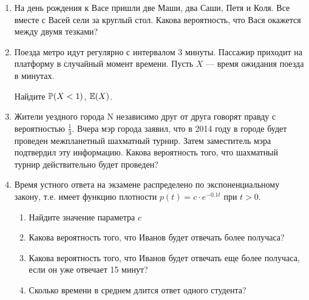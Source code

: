\begin{enumerate}
\item На день рождения к Васе пришли две Маши, два Саши, Петя и Коля. Все вместе с Васей сели за круглый стол. Какова вероятность, что Вася окажется между двумя тезками?

\item Поезда метро идут регулярно с интервалом 3 минуты. Пассажир
приходит на платформу в случайный момент времени. Пусть $X$ —
время ожидания поезда в минутах.

Найдите $\P(X<1)$, $\E(X)$.


\item Жители уездного города N независимо друг от друга говорят правду с вероятностью $\frac{1}{3}$. Вчера мэр города заявил, что в 2014 году в городе будет проведен межпланетный шахматный турнир. Затем заместитель мэра подтвердил эту информацию.
Какова вероятность того, что шахматный турнир действительно будет проведен?

\item Время устного ответа на экзамене распределено по экспоненциальному закону, т.е. имеет функцию плотности $p(t)=c\cdot e^{-0.1t}$ при $t>0$.
\begin{enumerate}
\item Найдите значение параметра $c$
\item Какова вероятность того, что Иванов будет отвечать более получаса?
\item Какова вероятность того, что Иванов будет отвечать еще более получаса, если он уже отвечает 15 минут?
\item Сколько времени в среднем длится ответ одного студента?
\end{enumerate}





\end{enumerate}
